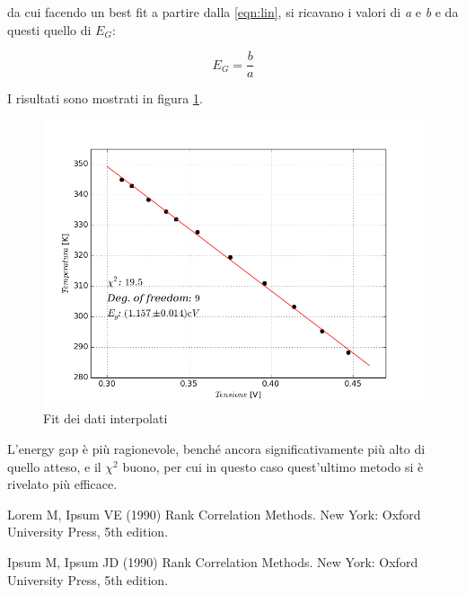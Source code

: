 \documentclass[a4paper]{article}
\begin{document}
\begin{itemize}
da cui facendo un best fit a partire dalla \ref{eqn:lin}, si ricavano i valori di \emph{a} e \emph{b} e da questi quello di $E_G$:

\begin{equation}
E_G = \frac{b}{a}
\end{equation}

I risultati sono mostrati in figura \ref{fig:int}.

\begin{figure}[!h]
\centering
\includegraphics[scale=.5]{interpol}
\caption{Fit dei dati interpolati}
\label{fig:int}
\end{figure}

L'energy gap è più ragionevole, benché ancora significativamente più alto di quello atteso, e il $\chi ^2$ buono, per cui in questo caso quest'ultimo metodo si è rivelato più efficace.

\end{itemize}
\begin{thebibliography}{10}
Lorem M, Ipsum VE (1990) Rank Correlation Methods. New York: Oxford University Press, 5th edition.

Ipsum M, Ipsum JD (1990) Rank Correlation Methods. New York: Oxford University Press, 5th edition.

\end{thebibliography}
\end{document}
